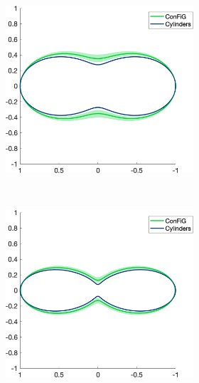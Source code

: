 \begin{figure}
  \centering
  \begin{subfigure}[]{\textwidth}
  \begin{subfigure}[]{0.3\textwidth}
    \includegraphics[width=\textwidth]{figures/frf_experiment/fibres_prctiles_kappa_2_b_1000}
  \end{subfigure}
  ~
  \begin{subfigure}[]{0.3\textwidth}
    \includegraphics[width=\textwidth]{figures/frf_experiment/fibres_prctiles_kappa_2_b_2000}

\end{subfigure}
\end{subfigure}
\end{figure}
